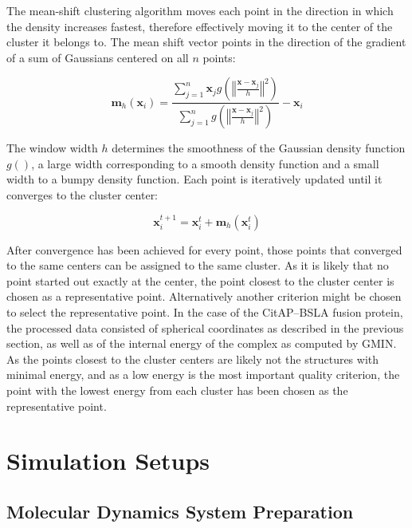 \documentclass[english, a4paper, 12pt, titlepage, draft]{article}
\newcommand{\vect}[1]{\mathbf{#1}}
\newcommand{\norm}[1]{\left\Vert#1\right\Vert}
\newcommand{\fun}[2]{#1\left(#2\right)}
\begin{document}
The mean-shift clustering algorithm moves each point in the direction in which the density increases fastest, therefore effectively moving it to the center of the cluster it belongs to.
The mean shift vector points in the direction of the gradient of a sum of Gaussians centered on all $n$ points:

\newcommand{\g}{\fun{g}{\norm{\frac{\vect{x} - \vect{x}_j}{h}}^2}}
\newcommand{\sumi}{\sum_{i=1}^{n}}
\newcommand{\sumj}{\sum_{j=1}^{n}}

\begin{equation}
    \vect{m}_h(\vect{x}_i) = \frac{\sumj \vect{x}_j \g}{\sumj \g} - \vect{x}_i
\end{equation}

\noindent
The window width $h$ determines the smoothness of the Gaussian density function $g()$, a large width corresponding to a smooth density function and a small width to a bumpy density function.
Each point is iteratively updated until it converges to the cluster center:

\begin{equation}
    \vect{x}_i^{t+1} = \vect{x}_i^t + \vect{m}_h(\vect{x}_i^t)
\end{equation}

\noindent
After convergence has been achieved for every point, those points that converged to the same centers can be assigned to the same cluster.
As it is likely that no point started out exactly at the center, the point closest to the cluster center is chosen as a representative point.
Alternatively another criterion might be chosen to select the representative point.
In the case of the CitAP--BSLA fusion protein, the processed data consisted of spherical coordinates as described in the previous section, as well as of the internal energy of the complex as computed by GMIN.
As the points closest to the cluster centers are likely not the structures with minimal energy, and as a low energy is the most important quality criterion, the point with the lowest energy from each cluster has been chosen as the representative point.



\section{Simulation Setups}

\subsection{Molecular Dynamics System Preparation}
\end{document}
